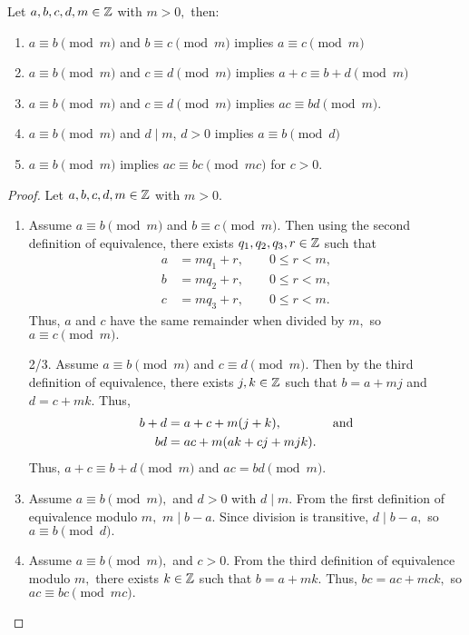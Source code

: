 \documentclass{../ximera}
\begin{document}
\begin{proposition}\label{prop:equiv-arith}
 Let $a,b,c,d,m\in\mathbb Z$ with $m>0,$ then:
\begin{enumerate}
\item $a\equiv b \pmod{m}$ and $b\equiv c \pmod{m}$ implies $a\equiv c \pmod{m}$
\item\label{equiv-add} $a\equiv b \pmod{m}$ and $c\equiv d \pmod{m}$ implies $a+c \equiv b+d \pmod{m}$ 
\item\label{equiv-multiply} $a\equiv b\pmod{m}$ and $c\equiv d \pmod{m}$ implies $ac\equiv bd \pmod{m}$.
\item $a\equiv b \pmod{m}$ and $d\mid m$, $d>0$ implies $a\equiv b \pmod{d}$
\item\label{equiv-upmod} $a\equiv b \pmod{m}$ implies $ac\equiv bc \pmod{mc}$ for $c>0$.
\end{enumerate}
\end{proposition}
\begin{proof}
  Let $a,b,c,d,m\in\mathbb Z$ with $m>0.$
  
\begin{enumerate}
 \item Assume $a\equiv b \pmod{m}$ and $b\equiv c \pmod{m}.$ Then using the second definition of equivalence, there exists $q_1,q_2,q_3,r\in\mathbb Z$ such that 
\begin{align*}
 a&=mq_1+r, \qquad 0\leq r<m,\\
 b&=mq_2+r, \qquad 0\leq r<m,\\
 c&=mq_3+r, \qquad 0\leq r<m. 
\end{align*}
Thus, $a$ and $c$ have the same remainder when divided by $m,$ so $a\equiv c\pmod m.$

\item[2/3.] Assume $a\equiv b \pmod{m}$ and $c\equiv d \pmod{m}.$ Then by the third definition of equivalence, there exists $j,k\in\mathbb Z$ such that $b=a+mj$ and $d=c+mk.$ Thus, 
\begin{align*}
 b+d&=a+c+m(j+k), \qquad\qquad\textnormal{and}\\
 bd &= ac+m(ak+cj+mjk).
\end{align*}
Thus, $a+c\equiv b+d\pmod m$ and $ac=bd\pmod m.$

\setcounter{enumi}{3}
\item Assume $a\equiv b \pmod{m},$ and $d>0$ with $d\mid m.$ From the first definition of equivalence modulo $m,$ $m\mid b-a$. Since division is transitive, $d\mid b-a,$ so $a\equiv b\pmod d.$

\item Assume $a\equiv b \pmod{m},$ and $c>0.$ From the third definition of equivalence modulo $m,$ there exists $k\in\mathbb Z$ such that $b=a+mk.$ Thus, $bc=ac+mck,$ so $ac\equiv bc \pmod{mc}.$ \qedhere
\end{enumerate}
\end{proof}
\end{document}
